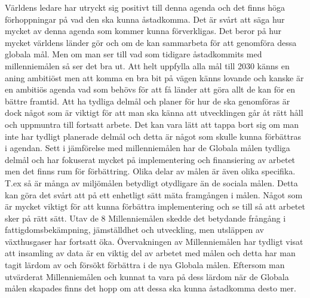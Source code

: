 \documentclass{report}
\begin{document}
Världens ledare har utryckt sig positivt till denna agenda och det finns höga förhoppningar på vad den ska kunna åstadkomma. Det är svårt att säga hur mycket av denna agenda som kommer kunna förverkligas. Det beror på hur mycket världens länder gör och om de kan sammarbeta för att genomföra dessa globala mål. Men om man ser till vad som tidigare åstadkommits med millenniemålen så ser det bra ut. Att helt uppfylla alla mål till 2030 känns en aning ambitiöst men att komma en bra bit på vägen känns lovande och kanske är en ambitiös agenda vad som behövs för att få länder att göra allt de kan för en bättre framtid. Att ha tydliga delmål och planer för hur de ska genomföras är dock något som är viktigt för att man ska känna att utvecklingen går åt rätt håll och uppmuntra till fortsatt arbete. Det kan vara lätt att tappa bort sig om man inte har tydligt planerade delmål och detta är något som skulle kunna förbättras i agendan. Sett i jämförelse med millenniemålen har de Globala målen tydliga delmål och har fokuserat mycket på implementering och finansiering av arbetet men det finns rum för förbättring. Olika delar av målen är även olika specifika. T.ex så är många av miljömålen betydligt otydligare än de sociala målen. Detta kan göra det svårt att på ett enhetligt sätt mäta framgången i målen. Något som är mycket viktigt för att kunna förbättra implementering och se till så att arbetet sker på rätt sätt. Utav de 8 Millenniemålen skedde det betydande frångång i fattigdomsbekämpning, jämställdhet och utveckling, men utsläppen av växthusgaser har fortsatt öka. Övervakningen av Millenniemålen har tydligt visat att insamling av data är en viktig del av arbetet med målen och detta har man tagit lärdom av och försökt förbättra i de nya Globala målen.\cite{Millennium} Eftersom man utvärderat Millenniemålen och kunnat ta vara på dess lärdom när de Globala målen skapades finns det hopp om att dessa ska kunna åstadkomma desto mer. \\
\end{document}
